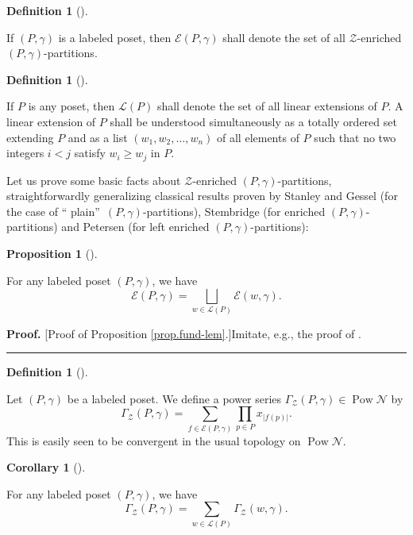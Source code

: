 \documentclass[numbers=enddot,12pt,final,onecolumn,notitlepage]{scrartcl}%
\theoremstyle{definition}
\newtheorem{prop}[theo]{Proposition}
\newenvironment{proposition}[1][]
{\begin{prop}[#1]\begin{leftbar}}
{\end{leftbar}\end{prop}}
\newtheorem{defi}[theo]{Definition}
\newenvironment{definition}[1][]
{\begin{defi}[#1]\begin{leftbar}}
{\end{leftbar}\end{defi}}
\newtheorem{coro}[theo]{Corollary}
\newenvironment{corollary}[1][]
{\begin{coro}[#1]\begin{leftbar}}
{\end{leftbar}\end{coro}}
\newenvironment{proof}[1][Proof]{\noindent\textbf{#1.} }{\ \rule{0.5em}{0.5em}}
\let\sumnonlimits\sum
\let\prodnonlimits\prod
\renewcommand{\sum}{\sumnonlimits\limits}
\renewcommand{\prod}{\prodnonlimits\limits}
\begin{document}
\begin{definition}
If $\left(  P,\gamma\right)  $ is a labeled poset, then $\mathcal{E}\left(
P,\gamma\right)  $ shall denote the set of all $\mathcal{Z}$-enriched $\left(
P,\gamma\right)  $-partitions.
\end{definition}

\begin{definition}
If $P$ is any poset, then $\mathcal{L}\left(  P\right)  $ shall denote the set
of all linear extensions of $P$. A linear extension of $P$ shall be understood
simultaneously as a totally ordered set extending $P$ and as a list $\left(
w_{1},w_{2},\ldots,w_{n}\right)  $ of all elements of $P$ such that no two
integers $i<j$ satisfy $w_{i}\geq w_{j}$ in $P$.
\end{definition}

Let us prove some basic facts about $\mathcal{Z}$-enriched $\left(
P,\gamma\right)  $-partitions, straightforwardly generalizing classical
results proven by Stanley and Gessel (for the case of \textquotedblleft
plain\textquotedblright\ $\left(  P,\gamma\right)  $-partitions), Stembridge
(for enriched $\left(  P,\gamma\right)  $-partitions) and Petersen (for left
enriched $\left(  P,\gamma\right)  $-partitions):

\begin{proposition}
\label{prop.fund-lem}For any labeled poset $\left(  P,\gamma\right)  $, we
have%
\[
\mathcal{E}\left(  P,\gamma\right)  =\bigsqcup_{w\in\mathcal{L}\left(
P\right)  }\mathcal{E}\left(  w,\gamma\right)  .
\]

\end{proposition}

\begin{proof}
[Proof of Proposition \ref{prop.fund-lem}.]Imitate, e.g., the proof of
\cite[Lemma 2.1]{Stembr97}.
\end{proof}

\begin{definition}
\label{def.GammaZ}Let $\left(  P,\gamma\right)  $ be a labeled poset. We
define a power series $\Gamma_{\mathcal{Z}}\left(  P,\gamma\right)
\in\operatorname*{Pow}\mathcal{N}$ by%
\[
\Gamma_{\mathcal{Z}}\left(  P,\gamma\right)  =\sum_{f\in\mathcal{E}\left(
P,\gamma\right)  }\prod_{p\in P}x_{\left\vert f\left(  p\right)  \right\vert
}.
\]
This is easily seen to be convergent in the usual topology on
$\operatorname*{Pow}\mathcal{N}$.
\end{definition}

\begin{corollary}
\label{cor.fund-lem}For any labeled poset $\left(  P,\gamma\right)  $, we have%
\[
\Gamma_{\mathcal{Z}}\left(  P,\gamma\right)  =\sum_{w\in\mathcal{L}\left(
P\right)  }\Gamma_{\mathcal{Z}}\left(  w,\gamma\right)  .
\]

\end{corollary}
\end{document}
